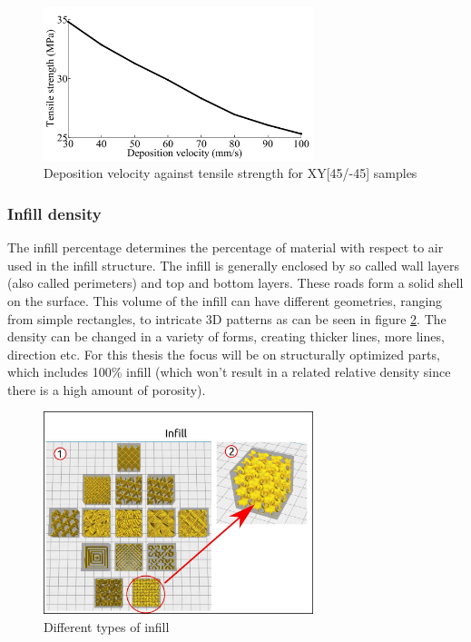 \begin{figure}[htb]
    \centering
    \includegraphics[width=0.7\textwidth]{chapter_2/figures/depostionspeed.PNG}
    \caption{Deposition velocity against tensile strength for XY[45/-45] samples \cite{Li2017TheProperties}}
    \label{fig:depositionspeed}
\end{figure}

\subsubsection{Infill density}
The infill percentage determines the percentage of material with respect to air used in the infill structure. The infill is generally enclosed by so called wall layers (also called perimeters) and top and bottom layers. These roads form a solid shell on the surface. This volume of the infill can have different geometries, ranging from simple rectangles, to intricate 3D patterns as can be seen in figure \ref{fig:Infill}. The density can be changed in a variety of forms, creating thicker lines, more lines, direction etc. For this thesis the focus will be on structurally optimized parts, which includes 100\% infill (which won't result in a related relative density since there is a high amount of porosity).

\begin{figure}[htb]
    \centering
    \includegraphics[width=0.7\textwidth]{chapter_2/figures/Infillbetter.jpg}
    \caption{Different types of infill \cite{UltimakerSpeed}}
    \label{fig:Infill}
\end{figure}

